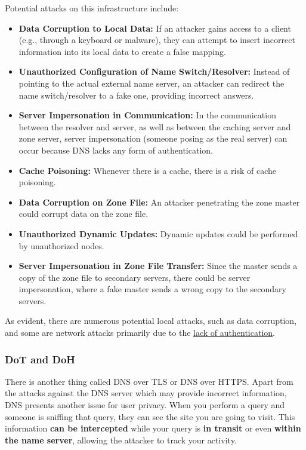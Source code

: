 Potential attacks on this infrastructure include:
\begin{itemize}
	\item \textbf{Data Corruption to Local Data:} If an attacker gains access to a client (e.g., through a keyboard or malware), they can attempt to insert incorrect information into its local data to create a false mapping.

	\item \textbf{Unauthorized Configuration of Name Switch/Resolver:} Instead of pointing to the actual external name server, an attacker can redirect the name switch/resolver to a fake one, providing incorrect answers.

	\item \textbf{Server Impersonation in Communication:} In the communication between the resolver and server, as well as between the caching server and zone server, server impersonation (someone posing as the real server) can occur because DNS lacks any form of authentication.

	\item \textbf{Cache Poisoning:} Whenever there is a cache, there is a risk of cache poisoning.

	\item \textbf{Data Corruption on Zone File:} An attacker penetrating the zone master could corrupt data on the zone file.

	\item \textbf{Unauthorized Dynamic Updates:} Dynamic updates could be performed by unauthorized nodes.

	\item \textbf{Server Impersonation in Zone File Transfer:} Since the master sends a copy of the zone file to secondary servers, there could be server impersonation, where a fake master sends a wrong copy to the secondary servers.
\end{itemize}

As evident, there are numerous potential local attacks, such as data corruption, and some are network attacks primarily due to the \underline{lack of authentication}.

\subsubsection{DoT and DoH}
There is another thing called DNS over TLS or DNS over HTTPS. Apart from the attacks against the DNS server which may provide incorrect information, DNS presents another issue for user privacy. When you perform a query and someone is sniffing that query, they can see the site you are going to visit. This information \textbf{can be intercepted} while your query is \textbf{in transit} or even \textbf{within the name server}, allowing the attacker to track your activity.

